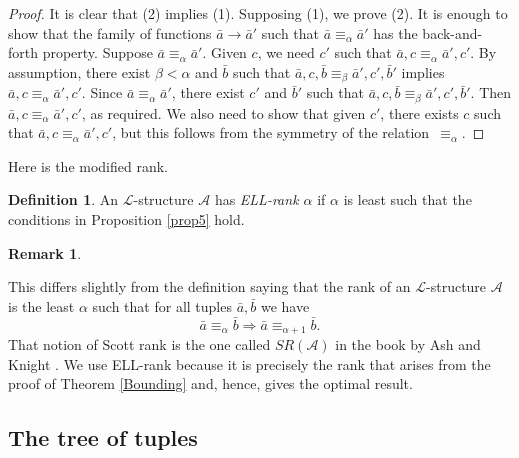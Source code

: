 \documentclass{article}
\newcommand{\ELL}{\textnormal{ELL}}
\theoremstyle{definition}
\newtheorem{defn}[thm]{Definition}
\newtheorem{remark}[thm]{Remark}
\begin{document}
	\begin{proof}
		
		It is clear that (2) implies (1). Supposing (1), we prove (2). It is enough to show that the family of functions $\bar{a}\rightarrow\bar{a}'$ such that $\bar{a}\equiv_\alpha\bar{a}'$ has the back-and-forth property. Suppose $\bar{a}\equiv_\alpha\bar{a}'$. Given $c$, we need $c'$ such that $\bar{a},c\equiv_\alpha \bar{a}',c'$. By assumption, there exist $\beta < \alpha$ and $\bar{b}$ such that $\bar{a},c,\bar{b}\equiv_\beta\bar{a}',c',\bar{b}'$ implies $\bar{a},c\equiv_\alpha\bar{a}',c'$. Since $\bar{a}\equiv_\alpha\bar{a}'$, there exist $c'$ and $\bar{b}'$ such that $\bar{a},c,\bar{b}\equiv_\beta\bar{a}',c',\bar{b}'$. Then $\bar{a},c\equiv_\alpha\bar{a}',c'$, as required. We also need to show that given $c'$, there exists $c$ such that $\bar{a},c\equiv_\alpha \bar{a}',c'$, but this follows from the symmetry of the relation~$\equiv_\alpha$.
	\end{proof}
	
	Here is the modified rank.
	
	\begin{defn}
		
		An $\mathcal{L}$-structure $\mathcal{A}$ has \emph{\ELL-rank $\alpha$} if $\alpha$ is least such that the conditions in Proposition \ref{prop5} hold. 
		
	\end{defn}
	
	\begin{remark}
		\label{rem:symm}
		
		This differs slightly from the definition saying that the rank of an $\mathcal{L}$-structure $\mathcal{A}$ is the least $\alpha$ such that for all tuples $\bar{a},\bar{b}$ we have
		\[ \bar{a}\equiv_\alpha \bar{b} \Longrightarrow \bar{a} \equiv_{\alpha + 1} \bar{b}.\]
		That notion of Scott rank is the one called $SR(\mathcal{A})$ in the book by Ash and Knight \cite{AK00}. We use \ELL-rank because it is precisely the rank that arises from the proof of Theorem \ref{Bounding} and, hence, gives the optimal result.
		
	\end{remark}
	
	\subsection{The tree of tuples}
	
\end{document}

